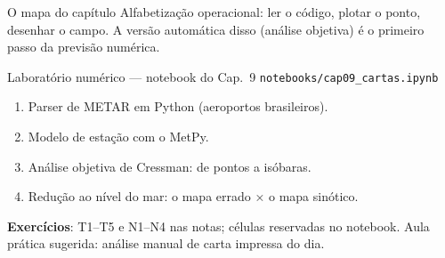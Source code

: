 \documentclass[aspectratio=169,11pt]{beamer}
\begin{document}
\begin{frame}{O mapa do capítulo}
  \vspace{0.6em}
  Alfabetização operacional: ler o código, plotar o ponto, desenhar o
  campo. A versão automática disso (análise objetiva) é o primeiro passo
  da previsão numérica.
\end{frame}

\begin{frame}{Laboratório numérico --- notebook do Cap.~9}
  \texttt{notebooks/cap09\_cartas.ipynb}
  \begin{enumerate}
    \item Parser de METAR em Python (aeroportos brasileiros).
    \item Modelo de estação com o MetPy.
    \item Análise objetiva de Cressman: de pontos a isóbaras.
    \item Redução ao nível do mar: o mapa errado × o mapa sinótico.
  \end{enumerate}
  \vspace{0.4em}
  \textbf{Exercícios}: T1--T5 e N1--N4 nas notas; células reservadas no
  notebook. Aula prática sugerida: análise manual de carta impressa do
  dia.
  \vfill
  \atribuicao
\end{frame}
\end{document}
